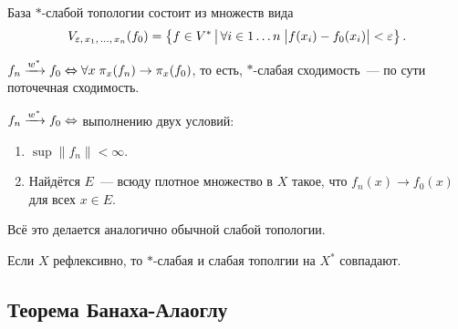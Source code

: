 \documentclass{notes}
\newcommand{\ta}{$*$}
\newcommand{\sweak}{\xrightarrow{w^{*}}}
\begin{document}
	\begin{st}
		База \ta-слабой топологии состоит из множеств вида
		\[
			V_{\varepsilon, \, x_1, \, \ldots, \, x_n}(f_0) = \left\{f \in V^{*} \, \big | \, \forall i \in 1\ldots n \; \big|f(x_i) - f_0(x_i)\big| < \varepsilon \right\}.
		\]
	\end{st}

	\begin{st}
		$f_n \sweak f_0 \eqv \all x \; \pi_x(f_n) \to \pi_x(f_0)$, то есть, \ta-слабая сходимость~--- по сути поточечная сходимость.
	\end{st}

	\begin{thm}
		$f_n \sweak f_0 \eqv$ выполнению двух условий:
		\begin{enumerate}
			\item $\sup \|f_n\| < \infty$.
			\item Найдётся $E$~--- всюду плотное множество в $X$ такое, что $f_n(x) \to f_0(x)$ для всех $x \in E$.
		\end{enumerate}
	\end{thm}

	Всё это делается аналогично обычной слабой топологии.

	\begin{exm}
		Если $X$ рефлексивно, то \ta-слабая и слабая тополгии на $X^{*}$ совпадают. 
	\end{exm}

\subsection{Теорема Банаха-Алаоглу}
\end{document}
